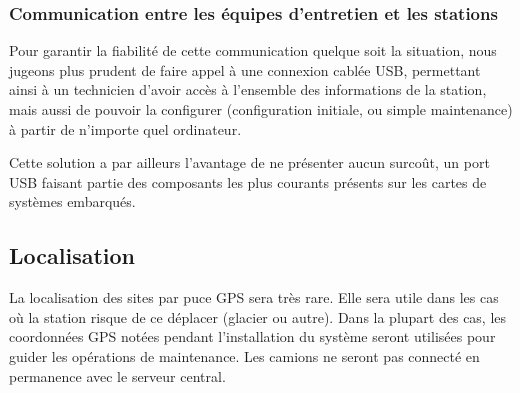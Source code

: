 \subsubsection{Communication entre les équipes d’entretien et les stations}

Pour garantir la fiabilité de cette communication quelque soit la situation, nous jugeons plus prudent de faire appel à une connexion cablée USB, permettant ainsi à un technicien d’avoir accès à l’ensemble des informations de la station, mais aussi de pouvoir la configurer (configuration initiale, ou simple maintenance) à partir de n’importe quel ordinateur.

Cette solution a par ailleurs l’avantage de ne présenter aucun surcoût, un port USB faisant partie des composants les plus courants présents sur les cartes de systèmes embarqués.

\subsection{Localisation}

La localisation des sites par puce GPS sera très rare. Elle sera utile dans les cas où la station risque de ce déplacer (glacier ou autre). Dans la plupart des cas, les coordonnées GPS notées pendant l’installation du système seront utilisées pour guider les opérations de maintenance.
Les camions ne seront pas connecté en permanence avec le serveur central.


	 	

